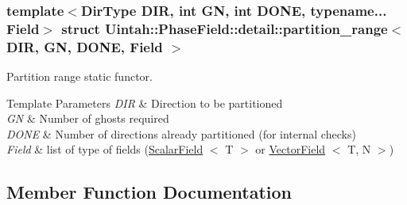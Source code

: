\subsubsection*{template$<$Dir\+Type D\+IR, int GN, int D\+O\+NE, typename... Field$>$\newline
struct Uintah\+::\+Phase\+Field\+::detail\+::partition\+\_\+range$<$ D\+I\+R, G\+N, D\+O\+N\+E, Field $>$}

Partition range static functor. 


\begin{DoxyTemplParams}{Template Parameters}
{\em D\+IR} & Direction to be partitioned \\
\hline
{\em GN} & Number of ghosts required \\
\hline
{\em D\+O\+NE} & Number of directions already partitioned (for internal checks) \\
\hline
{\em Field} & list of type of fields (\hyperlink{structUintah_1_1PhaseField_1_1ScalarField}{Scalar\+Field} $<$ T $>$ or \hyperlink{structUintah_1_1PhaseField_1_1VectorField}{Vector\+Field} $<$ T, N $>$) \\
\hline
\end{DoxyTemplParams}


\subsection{Member Function Documentation}
\mbox{\label{structUintah_1_1PhaseField_1_1detail_1_1partition__range_a23c5d8d614575b5c5be05418ea87d014}} 
